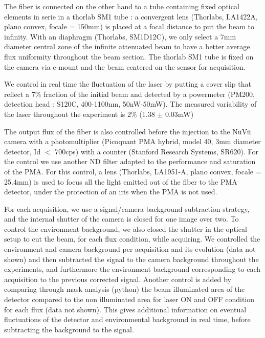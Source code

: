 \documentclass{article}
\begin{document}
The fiber is connected on the other hand to a tube containing fixed optical elements in serie in a thorlab SM1 tube : a convergent lens (Thorlabs, LA1422A, plano convex, focale = 150mm) is placed at a focal distance to put the beam to infinity. 
With  an diaphragm (Thorlabs, SM1D12C), we only select a 7mm diameter central zone of the infinite attenuated beam to have a better average flux uniformity throughout the beam section.
The thorlab SM1 tube is fixed on the camera via c-mount and the beam centered on the sensor for acquisition.

We control in real time the fluctuation of the laser by putting a cover slip that reflect a 7$\%$ fraction of the initial beam and detected by a powermeter (PM200, detection head : S120C, 400-1100nm, 50nW-50mW).
The measured variability of the laser throughout the experiment is 2$\%$ (1.38 $\pm$ 0.03mW)

The output flux of the fiber is also controlled before the injection to the NüVü camera with a photomultiplier (Picoquant PMA hybrid, model 40, 3mm diameter detector, Id $<$ 700cps) with a counter (Stanford Research Systems, SR620). For the control we use another ND filter adapted to the performance and saturation of the PMA.
For this control, a lens (Thorlabs, LA1951-A,  plano convex, focale = 25.4mm) is used to focus all the light emitted out of the fiber to the PMA detector, under the protection of an iris when the PMA is not used.

For each acquisition, we use a signal/camera background subtraction strategy, and the internal shutter of the camera is closed for one image over two. 
To control the environment background, we also closed the shutter in the optical setup to cut the beam, for each flux condition, while acquiring.
We controlled the environment and camera background per acquisition and its evolution (data not shown) and then subtracted the signal to the camera background throughout the experiments, and furthermore the environment background corresponding to each acquisition to the previous corrected signal.
Another control is added by comparing through mask analysis (python) the beam illuminated area of the detector compared to the non illuminated area for laser ON and OFF condition for each flux (data not shown). 
This gives additional information on eventual fluctuations of the detector and environmental background in real time, before subtracting the background to the signal.
\end{document}
